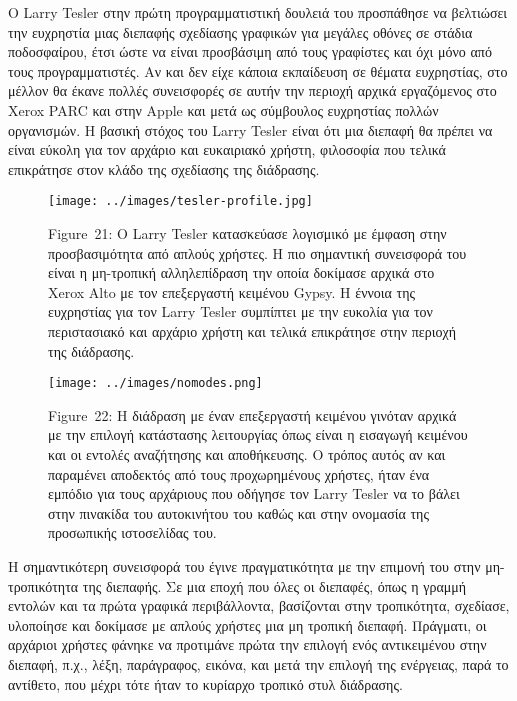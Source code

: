 \documentclass[
]{article}
\begin{document}
Ο Larry Tesler στην πρώτη προγραμματιστική δουλειά του προσπάθησε να
βελτιώσει την ευχρηστία μιας διεπαφής σχεδίασης γραφικών για μεγάλες
οθόνες σε στάδια ποδοσφαίρου, έτσι ώστε να είναι προσβάσιμη από τους
γραφίστες και όχι μόνο από τους προγραμματιστές. Αν και δεν είχε κάποια
εκπαίδευση σε θέματα ευχρηστίας, στο μέλλον θα έκανε πολλές συνεισφορές
σε αυτήν την περιοχή αρχικά εργαζόμενος στο Xerox PARC και στην Apple
και μετά ως σύμβουλος ευχρηστίας πολλών οργανισμών. Η βασική στόχος του
Larry Tesler είναι ότι μια διεπαφή θα πρέπει να είναι εύκολη για τον
αρχάριο και ευκαιριακό χρήστη, φιλοσοφία που τελικά επικράτησε στον
κλάδο της σχεδίασης της διάδρασης.

\leavevmode{}%
\begin{figure}
\hypertarget{fig:tesler-profile}{%
\centering
\texttt{[image: ../images/tesler-profile.jpg]}
\caption{Figure~21: Ο Larry Tesler κατασκεύασε λογισμικό με έμφαση στην
προσβασιμότητα από απλούς χρήστες. Η πιο σημαντική συνεισφορά του είναι
η μη-τροπική αλληλεπίδραση την οποία δοκίμασε αρχικά στο Xerox Alto με
τον επεξεργαστή κειμένου Gypsy. Η έννοια της ευχρηστίας για τον Larry
Tesler συμπίπτει με την ευκολία για τον περιστασιακό και αρχάριο χρήστη
και τελικά επικράτησε στην περιοχή της
διάδρασης.}\label{fig:tesler-profile}
}
\end{figure}

\leavevmode{}%
\begin{figure}
\hypertarget{fig:nomodes}{%
\centering
\texttt{[image: ../images/nomodes.png]}
\caption{Figure~22: Η διάδραση με έναν επεξεργαστή κειμένου γινόταν
αρχικά με την επιλογή κατάστασης λειτουργίας όπως είναι η εισαγωγή
κειμένου και οι εντολές αναζήτησης και αποθήκευσης. Ο τρόπος αυτός αν
και παραμένει αποδεκτός από τους προχωρημένους χρήστες, ήταν ένα εμπόδιο
για τους αρχάριους που οδήγησε τον Larry Tesler να το βάλει στην
πινακίδα του αυτοκινήτου του καθώς και στην ονομασία της προσωπικής
ιστοσελίδας του.}\label{fig:nomodes}
}
\end{figure}

Η σημαντικότερη συνεισφορά του έγινε πραγματικότητα με την επιμονή του
στην μη-τροπικότητα της διεπαφής. Σε μια εποχή που όλες οι διεπαφές,
όπως η γραμμή εντολών και τα πρώτα γραφικά περιβάλλοντα, βασίζονται στην
τροπικότητα, σχεδίασε, υλοποίησε και δοκίμασε με απλούς χρήστες μια μη
τροπική διεπαφή. Πράγματι, οι αρχάριοι χρήστες φάνηκε να προτιμάνε πρώτα
την επιλογή ενός αντικειμένου στην διεπαφή, π.χ., λέξη, παράγραφος,
εικόνα, και μετά την επιλογή της ενέργειας, παρά το αντίθετο, που μέχρι
τότε ήταν το κυρίαρχο τροπικό στυλ διάδρασης.
\end{document}
